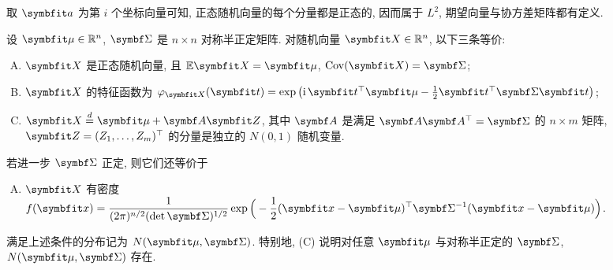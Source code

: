 取 $\rvec{a}$ 为第 $i$ 个坐标向量可知, 正态随机向量的每个分量都是正态的, 因而属于 $L^2$, 期望向量与协方差矩阵都有定义.

\begin{theorem}[多元正态分布的等价刻画]\label{thm:gaussian-equivalent}
设 $\rvec{\mu}\in\R^n$, $\mat{\Sigma}$ 是 $n\times n$ 对称半正定矩阵. 对随机向量 $\rvec{X}\in\R^n$, 以下三条等价:
\begin{enumerate}[(A)]
\item $\rvec{X}$ 是正态随机向量, 且 $\E\rvec{X}=\rvec{\mu}$, $\Cov(\rvec{X})=\mat{\Sigma}$;
\item $\rvec{X}$ 的特征函数为 $\varphi_{\rvec{X}}(\rvec{t})=\exp\big(\mathrm{i}\,\rvec{t}^\T\rvec{\mu}-\frac{1}{2}\rvec{t}^\T\mat{\Sigma}\rvec{t}\big)$;
\item $\rvec{X}\overset{d}{=}\rvec{\mu}+\mat{A}\rvec{Z}$, 其中 $\mat{A}$ 是满足 $\mat{A}\mat{A}^\T=\mat{\Sigma}$ 的 $n\times m$ 矩阵, $\rvec{Z}=(Z_1,\dots,Z_m)^\T$ 的分量是独立的 $N(0,1)$ 随机变量.
\end{enumerate}
若进一步 $\mat{\Sigma}$ 正定, 则它们还等价于
\begin{enumerate}[(A),start=4]
\item $\rvec{X}$ 有密度
$\displaystyle f(\rvec{x})=\frac{1}{(2\pi)^{n/2}(\det\mat{\Sigma})^{1/2}}\exp\Big(-\frac{1}{2}(\rvec{x}-\rvec{\mu})^\T\mat{\Sigma}^{-1}(\rvec{x}-\rvec{\mu})\Big)$.
\end{enumerate}
满足上述条件的分布记为 $N(\rvec{\mu},\mat{\Sigma})$. 特别地, (C) 说明对任意 $\rvec{\mu}$ 与对称半正定的 $\mat{\Sigma}$, $N(\rvec{\mu},\mat{\Sigma})$ 存在.
\end{theorem}

